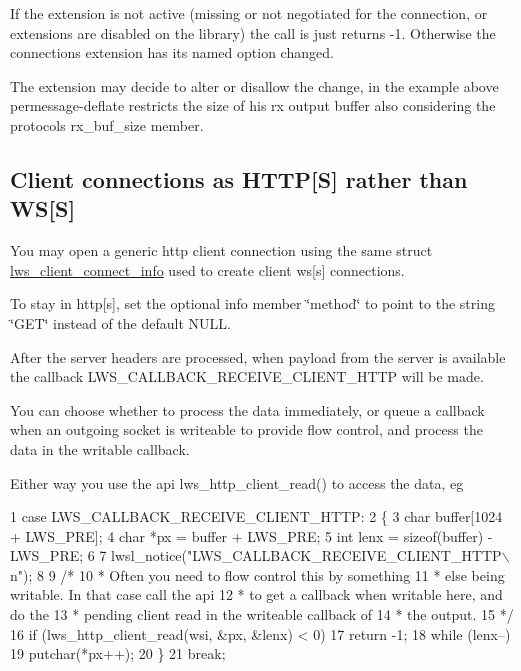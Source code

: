 If the extension is not active (missing or not negotiated for the connection, or extensions are disabled on the library) the call is just returns -\/1. Otherwise the connection\textquotesingle{}s extension has its named option changed.

The extension may decide to alter or disallow the change, in the example above permessage-\/deflate restricts the size of his rx output buffer also considering the protocol\textquotesingle{}s rx\+\_\+buf\+\_\+size member.

\subsection*{Client connections as H\+T\+TP\mbox{[}S\mbox{]} rather than WS\mbox{[}S\mbox{]} }

You may open a generic http client connection using the same struct \hyperlink{structlws__client__connect__info}{lws\+\_\+client\+\_\+connect\+\_\+info} used to create client ws\mbox{[}s\mbox{]} connections.

To stay in http\mbox{[}s\mbox{]}, set the optional info member \char`\"{}method\char`\"{} to point to the string \char`\"{}\+G\+E\+T\char`\"{} instead of the default N\+U\+LL.

After the server headers are processed, when payload from the server is available the callback L\+W\+S\+\_\+\+C\+A\+L\+L\+B\+A\+C\+K\+\_\+\+R\+E\+C\+E\+I\+V\+E\+\_\+\+C\+L\+I\+E\+N\+T\+\_\+\+H\+T\+TP will be made.

You can choose whether to process the data immediately, or queue a callback when an outgoing socket is writeable to provide flow control, and process the data in the writable callback.

Either way you use the api {\ttfamily lws\+\_\+http\+\_\+client\+\_\+read()} to access the data, eg


\begin{DoxyCode}
1 case LWS\_CALLBACK\_RECEIVE\_CLIENT\_HTTP:
2         \{
3                 char buffer[1024 + LWS\_PRE];
4                 char *px = buffer + LWS\_PRE;
5                 int lenx = sizeof(buffer) - LWS\_PRE;
6 
7                 lwsl\_notice("LWS\_CALLBACK\_RECEIVE\_CLIENT\_HTTP\(\backslash\)n");
8 
9                 /*
10                  * Often you need to flow control this by something
11                  * else being writable.  In that case call the api
12                  * to get a callback when writable here, and do the
13                  * pending client read in the writeable callback of
14                  * the output.
15                  */
16                 if (lws\_http\_client\_read(wsi, &px, &lenx) < 0)
17                         return -1;
18                 while (lenx--)
19                         putchar(*px++);
20         \}
21         break;
\end{DoxyCode}


